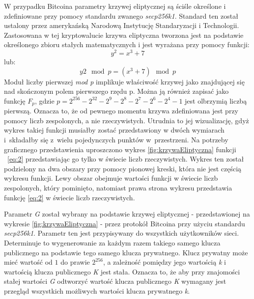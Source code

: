 \documentclass[12pt, twoside, final, openany]{mgr}
\begin{document}
\indent W przypadku Bitcoina parametry krzywej eliptycznej są ściśle określone i zdefiniowane przy pomocy standardu zwanego \textit{secp256k1}. Standard ten został ustalony przez amerykańską Narodową Instytucję Standaryzacji i Technologii. Zastosowana w tej kryptowalucie krzywa eliptyczna tworzona jest na podstawie określonego zbioru stałych matematycznych i jest wyrażana przy pomocy funkcji:
\begin{equation}
  y^2 = x^3 + 7 
\end{equation} 
\label{eq:2}
lub:
\begin{equation} 
\label{eq:3}
  y2 \mod p = (x^3 + 7) \mod p
\end{equation}
Moduł liczby pierwszej \textit{mod p} implikuje właściwość krzywej jako znajdującej się nad skończonym polem pierwszego rzędu p. Można ją również zapisać jako funkcję $F_p$, gdzie $p = 2^{256} - 2^{32} - 2^9 - 2^8 - 2^7 - 2^6 - 2^4 - 1$ jest olbrzymią liczbą pierwszą. Oznacza to, że od pewnego momentu krzywa zdefiniowana jest przy pomocy liczb zespolonych, a nie rzeczywistych. Utrudnia to jej wizualizację, gdyż wykres takiej funkcji musiałby zostać przedstawiony w dwóch wymiarach i~składałby się z~wielu pojedynczych punktów w~przestrzeni. Na potrzeby graficznego przedstawienia uproszczono wykres \ref{fig:krzywaEliptyczna} funkcji ~\ref{eq:2} przedstawiając go tylko w świecie liczb rzeczywistych. Wykres ten został podzielony na dwa obszary przy pomocy pionowej kreski, która nie jest częścią wykresu funkcji. Lewy obszar obejmuje wartości funkcji w świecie liczb zespolonych, który pominięto, natomiast prawa strona wykresu przedstawia funkcję \ref{eq:2} w świecie liczb rzeczywistych.

\indent Parametr \textit{G} został wybrany na podstawie krzywej eliptycznej - przedstawionej na wykresie \ref{fig:krzywaEliptyczna} - przez protokół Bitcoina przy użyciu standardu \textit{secp256k1}. Parametr ten jest przypisywany do wszystkich użytkowników sieci. Determinuje to wygenerowanie za każdym razem takiego samego klucza publicznego na podstawie tego samego klucza prywatnego. Klucz prywatny może mieć wartość od $1$ do prawie $2^{256}$, a zależność pomiędzy jego wartością \textit{k} i wartością klucza publicznego \textit{K} jest stała. Oznacza to, że aby przy znajomości stałej wartości \textit{G} odtworzyć wartość klucza publicznego \textit{K} wymagany jest przegląd wszystkich możliwych wartości klucza prywatnego \textit{k}. 
\end{document}
